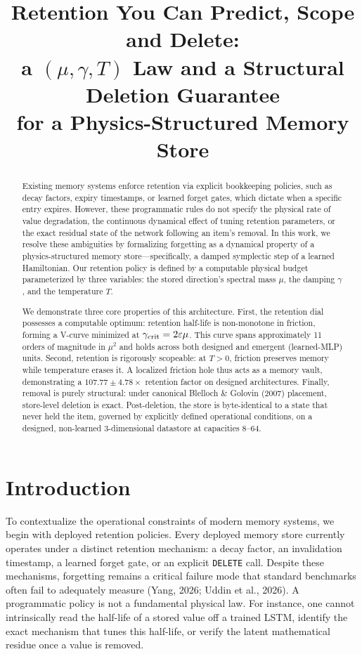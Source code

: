 \documentclass{article}
\title{Retention You Can Predict, Scope and Delete:\\ a $(\mu,\gamma,T)$ Law and a Structural Deletion Guarantee\\ for a Physics-Structured Memory Store}
\author{}
\begin{document}
\maketitle
\begin{abstract}
Existing memory systems enforce retention via explicit bookkeeping policies, such as decay factors, expiry timestamps, or learned forget gates, which dictate when a specific entry expires.
However, these programmatic rules do not specify the physical rate of value degradation, the continuous dynamical effect of tuning retention parameters, or the exact residual state of the network following an item's removal.
In this work, we resolve these ambiguities by formalizing forgetting as a dynamical property of a physics-structured memory store---specifically, a damped symplectic step of a learned Hamiltonian. Our retention policy is defined by a computable physical budget parameterized by three variables: the stored direction's spectral mass $\mu$, the damping $\gamma$, and the temperature $T$.

We demonstrate three core properties of this architecture. First, the retention dial possesses a computable optimum: retention half-life is non-monotone in friction, forming a V-curve minimized at $\gamma_{\rm crit}=2\varepsilon\mu$. This curve spans approximately 11 orders of magnitude in $\mu^2$ and holds across both designed and emergent (learned-MLP) units. Second, retention is rigorously scopeable: at $T>0$, friction preserves memory while temperature erases it. A localized friction hole thus acts as a memory vault, demonstrating a $107.77\pm4.78\times$ retention factor on designed architectures. Finally, removal is purely structural: under canonical Blelloch \& Golovin (2007) placement, store-level deletion is exact. Post-deletion, the store is byte-identical to a state that never held the item, governed by explicitly defined operational conditions, on a designed, non-learned 3-dimensional datastore at capacities 8--64.
\end{abstract}

\section{Introduction}\label{sec:intro}

To contextualize the operational constraints of modern memory systems, we begin with deployed retention policies. Every deployed memory store currently operates under a distinct retention mechanism: a decay factor, an invalidation timestamp, a learned forget gate, or an explicit \texttt{DELETE} call. Despite these mechanisms, forgetting remains a critical failure mode that standard benchmarks often fail to adequately measure (Yang, 2026; Uddin et al., 2026). A programmatic policy is not a fundamental physical law. For instance, one cannot intrinsically read the half-life of a stored value off a trained LSTM, identify the exact mechanism that tunes this half-life, or verify the latent mathematical residue once a value is removed.
\end{document}
